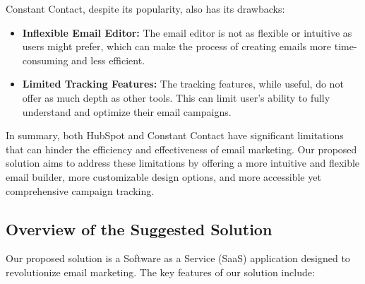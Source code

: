 Constant Contact, despite its popularity, also has its drawbacks:

\vspace{10pt}

\begin{itemize}
\item \textbf{Inflexible Email Editor:} The email editor is not as flexible or intuitive as users might prefer, which can make the process of creating emails more time-consuming and less efficient.
\item \textbf{Limited Tracking Features:} The tracking features, while useful, do not offer as much depth as other tools. This can limit user's ability to fully understand and optimize their email campaigns.
\end{itemize}

\vspace{10pt}

In summary, both HubSpot and Constant Contact have significant limitations that can hinder the efficiency and effectiveness of email marketing. Our proposed solution aims to address these limitations by offering a more intuitive and flexible email builder, more customizable design options, and more accessible yet comprehensive campaign tracking.


\subsection{Overview of the Suggested Solution}
Our proposed solution is a Software as a Service (SaaS) application designed to revolutionize email marketing. The key features of our solution include:

\vspace{10pt}

